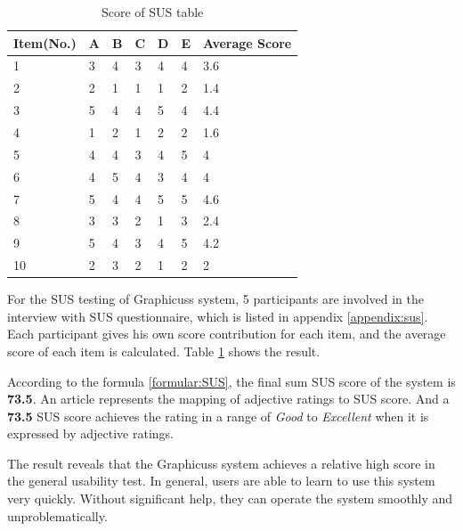 \begin{table}[!htbp]
\centering
\begin{tabularx}{\textwidth}{@{}lXXXXXl@{}}
\toprule
Item(No.)   & A  & B  & C  & D  & E          & Average Score        \\ \midrule
1               & 3  & 4  & 3  & 4  & 4          & 3.6                     \\
2               & 2  & 1  & 1  & 1  & 2          & 1.4                     \\
3               & 5  & 4  & 4  & 5  & 4          & 4.4                     \\
4               & 1  & 2  & 1  & 2  & 2          & 1.6                     \\
5               & 4  & 4  & 3  & 4  & 5          & 4                     \\
6               & 4  & 5  & 4  & 3  & 4          & 4                     \\
7               & 5  & 4  & 4  & 5  & 5          & 4.6                     \\
8               & 3  & 3  & 2  & 1  & 3          & 2.4                     \\
9               & 5  & 4  & 3  & 4  & 5          & 4.2                     \\
10              & 2  & 3  & 2  & 1  & 2          & 2                     \\ \bottomrule        
\end{tabularx}
\caption{Score of SUS table}
\label{table:score-sus}
\end{table}

For the SUS testing of Graphicuss system, 5 participants are involved in the interview with SUS questionnaire, which is listed in appendix \ref{appendix:sus}. Each participant gives his own score contribution for each item, and the average score of each item is calculated. Table \ref{table:score-sus} shows the result.

According to the formula \ref{formular:SUS}, the final sum SUS score of the system is \textbf{73.5}. An article represents the mapping of adjective ratings to SUS score\cite{bangor2009determining}. And a \textbf{73.5} SUS score achieves the rating in a range of \textit{Good} to \textit{Excellent} when it is expressed by adjective ratings. 

The result reveals that the Graphicuss system achieves a relative high score in the general usability test. In general, users are able to learn to use this system very quickly. Without significant help, they can operate the system smoothly and unproblematically. 


